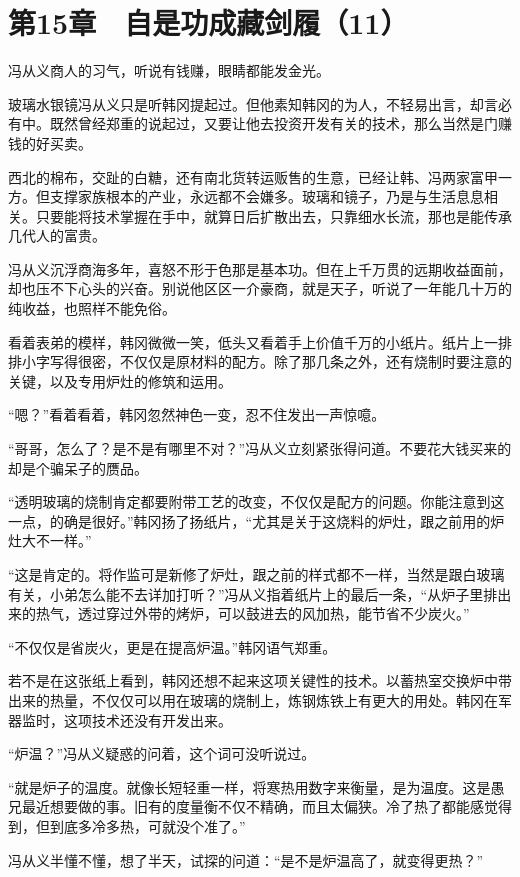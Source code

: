 \section{第15章　自是功成藏剑履（11）}

冯从义商人的习气，听说有钱赚，眼睛都能发金光。

玻璃水银镜冯从义只是听韩冈提起过。但他素知韩冈的为人，不轻易出言，却言必有中。既然曾经郑重的说起过，又要让他去投资开发有关的技术，那么当然是门赚钱的好买卖。

西北的棉布，交趾的白糖，还有南北货转运贩售的生意，已经让韩、冯两家富甲一方。但支撑家族根本的产业，永远都不会嫌多。玻璃和镜子，乃是与生活息息相关。只要能将技术掌握在手中，就算日后扩散出去，只靠细水长流，那也是能传承几代人的富贵。

冯从义沉浮商海多年，喜怒不形于色那是基本功。但在上千万贯的远期收益面前，却也压不下心头的兴奋。别说他区区一介豪商，就是天子，听说了一年能几十万的纯收益，也照样不能免俗。

看着表弟的模样，韩冈微微一笑，低头又看着手上价值千万的小纸片。纸片上一排排小字写得很密，不仅仅是原材料的配方。除了那几条之外，还有烧制时要注意的关键，以及专用炉灶的修筑和运用。

“嗯？”看着看着，韩冈忽然神色一变，忍不住发出一声惊噫。

“哥哥，怎么了？是不是有哪里不对？”冯从义立刻紧张得问道。不要花大钱买来的却是个骗呆子的赝品。

“透明玻璃的烧制肯定都要附带工艺的改变，不仅仅是配方的问题。你能注意到这一点，的确是很好。”韩冈扬了扬纸片，“尤其是关于这烧料的炉灶，跟之前用的炉灶大不一样。”

“这是肯定的。将作监可是新修了炉灶，跟之前的样式都不一样，当然是跟白玻璃有关，小弟怎么能不去详加打听？”冯从义指着纸片上的最后一条，“从炉子里排出来的热气，透过穿过外带的烤炉，可以鼓进去的风加热，能节省不少炭火。”

“不仅仅是省炭火，更是在提高炉温。”韩冈语气郑重。

若不是在这张纸上看到，韩冈还想不起来这项关键性的技术。以蓄热室交换炉中带出来的热量，不仅仅可以用在玻璃的烧制上，炼钢炼铁上有更大的用处。韩冈在军器监时，这项技术还没有开发出来。

“炉温？”冯从义疑惑的问着，这个词可没听说过。

“就是炉子的温度。就像长短轻重一样，将寒热用数字来衡量，是为温度。这是愚兄最近想要做的事。旧有的度量衡不仅不精确，而且太偏狭。冷了热了都能感觉得到，但到底多冷多热，可就没个准了。”

冯从义半懂不懂，想了半天，试探的问道：“是不是炉温高了，就变得更热？”

